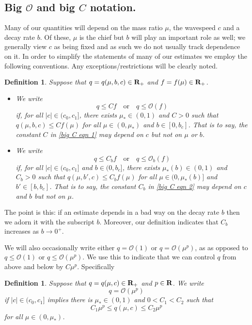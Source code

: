 \documentclass[12pt]{amsart}
\numberwithin{equation}{section}
\newtheorem{definition}[theorem]{Definition}
\newcommand{\be}{\begin{equation}}
\newcommand{\ee}{\end{equation}}
\newcommand{\R}{{\bf{R}}}
\renewcommand{\O}{{\mathcal{O}}}
\begin{document}
\subsection{Big $\O$ and big $C$ notation.}
Many of our 
quantities will depend on the mass ratio $\mu$, the wavespeed $c$ and a decay rate $b$.
Of these, $\mu$ is the chief but $b$ will play an important role as well; we generally view $c$
as being fixed and as such we do not usually track dependence on it. 
In order to simplify the statements of many of our estimates we 
employ the following conventions. Any exceptions/restrictions will be clearly noted.
\begin{definition}\label{big C def}
Suppose that $q = q (\mu,b,c) \in \R_+$ and $f = f(\mu) \in \R_+$. 
\begin{itemize}
\item We write
\be\label{big C eqn 1}
q \le C f  \quad \text{or} \quad q \le \O(f)
\ee
if, for all  $|c| \in (c_0,c_1]$, there exists $\mu_* \in (0,1) $ and $C>0$ such that
$q(\mu,b,c) \le C f(\mu)$ for all $\mu \in  (0,\mu_*)$ and $b \in [0,b_c]$. 
That is to say, the constant $C$ in \eqref{big C eqn 1}
may depend on $c$ but not on $\mu$ or $b$.

\item We write
\be\label{big C eqn 2}
q \le C_b f \quad \text{or} \quad q \le \O_b(f)
\ee
if, for all  $|c| \in (c_0,c_1]$ and $b \in (0,b_c]$, there exists $\mu_{*}(b) \in (0,1) $ and $C_b>0$ such that
$q(\mu,b',c) \le C_b f(\mu)$ for all $\mu \in  (0,\mu_{*}(b)]$ and $b' \in [b,b_c]$. 
That is to say, the constant $C_b$ in \eqref{big C eqn 2}
may depend on $c$ and $b$ but not on $\mu$.

\end{itemize}
\end{definition}
The point is this: if an estimate depends in a bad way on the decay rate $b$ then we adorn it with the subscript $b$.
Moreover, our definition indicates that $C_b$ increases as $b\to 0^+$.


We will also occasionally write either $q = \O(1)$ or $q=  \O(\mu^p)$, as
as opposed to $q \le \O(1)$ or $q \le   \O(\mu^p)$. 
We use this to indicate that we can control $q$ from above and below by $C\mu^p$.
Specifically
\begin{definition}\label{big C def 2}
Suppose that $q = q (\mu,c) \in \R_+$ and $p \in \R$.
We write
\be\label{big C eqn 3}
q = \O(\mu^p) 
\ee
if  $|c| \in (c_0,c_1]$ implies there is $\mu_*\in (0,1) $ and $0<C_1<C_2$ such that
$$
C_1 \mu^p \le q(\mu,c) \le C_2 \mu^p
$$
for all $\mu \in  (0,\mu_*)$. 
\end{definition}
\end{document}

